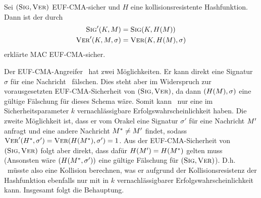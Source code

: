 \begin{theorem} Sei $(\textsc{Sig}, \textsc{Ver})$ EUF-CMA-sicher \indexEUFCMA und $H$
  eine kollisionsresistente Hashfunktion. Dann ist der durch
  \begin{align*} \textsc{Sig}'(K,M) &= \textsc{Sig}(K,H(M))\\ \textsc{Ver}'(K,M,\sigma) &=
                                                                  \textsc{Ver}(K,H(M),\sigma)
  \end{align*} erklärte MAC EUF-CMA-sicher.~\\
\end{theorem}

\begin{beweisidee}
  \label{ch:symauth:eufcma-beweis} Der EUF-CMA-Angreifer \A~hat zwei
  Möglichkeiten. Er kann direkt eine Signatur $\sigma$ für eine Nachricht
  \plaint~fälschen. Dies steht aber im Widerspruch zur vorausgesetzten
  EUF-CMA-Sicherheit von $(\textsc{Sig}, \textsc{Ver})$, da dann $(H(M), \sigma)$
  eine gültige Fälschung für dieses Schema wäre. Somit kann \A~nur eine im
  Sicherheitsparameter $k$ vernachlässigbare Erfolgswahrscheinlichkeit
  haben. Die zweite Möglichkeit ist, dass er vom Orakel eine Signatur
  $\sigma'$ für eine Nachricht $M'$ anfragt und eine andere
  Nachricht $M^* \neq M'$ findet, sodass $\textsc{Ver}'(H^*, \sigma')
  = \textsc{Ver}(H(M^*), \sigma') = 1$. Aus der EUF-CMA-Sicherheit von
  $(\textsc{Sig},\textsc{Ver})$ folgt aber direkt, dass dafür $H(M') = H(M^*)$
  gelten muss (Ansonsten wäre $(H(M^*, \sigma'))$ eine gültige
  Fälschung für $(\textsc{Sig}, \textsc{Ver})$). D.h. \A~müsste also eine Kollision
  berechnen, was er aufgrund der Kollisionsresistenz der Hashfunktion
  ebenfalls nur mit in $k$ vernachlässigbarer Erfolgswahrscheinlichkeit
  kann. Insgesamt folgt die Behauptung.
\end{beweisidee}

